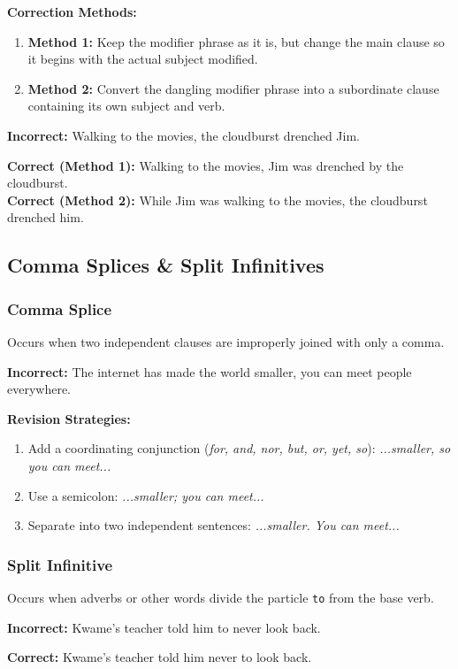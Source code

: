 \documentclass[11pt, a4paper]{article}
\begin{document}
\textbf{Correction Methods:}
\begin{enumerate}
    \item \textbf{Method 1:} Keep the modifier phrase as it is, but change the main clause so it begins with the actual subject modified.
    \item \textbf{Method 2:} Convert the dangling modifier phrase into a subordinate clause containing its own subject and verb.
\end{enumerate}

\begin{mdframed}[style=incorrectbox]
    \textbf{Incorrect:} Walking to the movies, the cloudburst drenched Jim.
\end{mdframed}
\begin{mdframed}[style=correctbox]
    \textbf{Correct (Method 1):} Walking to the movies, Jim was drenched by the cloudburst.\\
    \textbf{Correct (Method 2):} While Jim was walking to the movies, the cloudburst drenched him.
\end{mdframed}

\subsection{Comma Splices \& Split Infinitives}

\subsubsection{Comma Splice}
Occurs when two independent clauses are improperly joined with only a comma.
\begin{mdframed}[style=incorrectbox]
    \textbf{Incorrect:} The internet has made the world smaller, you can meet people everywhere.
\end{mdframed}
\textbf{Revision Strategies:}
\begin{enumerate}[label=\alph*)]
    \item Add a coordinating conjunction (\textit{for, and, nor, but, or, yet, so}): \textit{...smaller, so you can meet...}
    \item Use a semicolon: \textit{...smaller; you can meet...}
    \item Separate into two independent sentences: \textit{...smaller. You can meet...}
\end{enumerate}

\subsubsection{Split Infinitive}
Occurs when adverbs or other words divide the particle \texttt{to} from the base verb.
\begin{mdframed}[style=incorrectbox]
    \textbf{Incorrect:} Kwame's teacher told him to never look back.
\end{mdframed}
\begin{mdframed}[style=correctbox]
    \textbf{Correct:} Kwame's teacher told him never to look back.
\end{mdframed}
\end{document}
